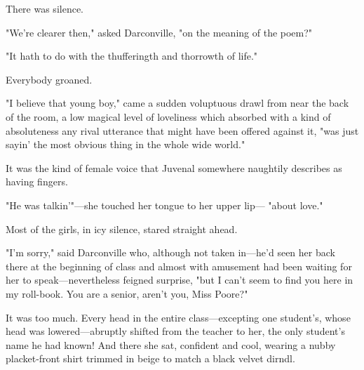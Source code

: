   There was silence.

  "We're clearer then," asked Darconville, "on the meaning of the poem?"

  "It hath to do with the thufferingth and thorrowth of life."

  Everybody groaned.

  "I believe that young boy," came a sudden voluptuous 
drawl 
from near the back
of the room, a low magical level of loveliness which absorbed with a kind of
absoluteness any rival utterance that might have been offered against it, "was
just sayin' the most obvious thing in the whole wide world."

  It was the kind of female voice that Juvenal somewhere naughtily describes as
having fingers.

  "He was talkin'"---she touched her tongue to her upper lip--- "about love."

  Most of the girls, in icy silence, stared straight ahead.

  "I'm sorry," said Darconville who, although not taken in---he'd seen her back
there at the beginning of class and almost with amusement had been waiting for
her to speak---nevertheless feigned 
surprise, "but I can't seem to find you here
in my roll-book. You are a senior, aren't you, Miss Poore?"

  It was too much. Every head in the entire class---excepting one student's, whose
head was lowered---abruptly shifted from the teacher to her, the only student's
name he had known! And there she sat, confident and cool, wearing a nubby
placket-front 
shirt trimmed 
in beige 
to match a black velvet dirndl.

